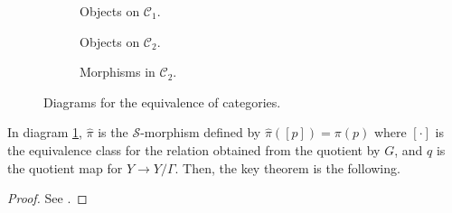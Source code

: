\begin{figure}[htbp]
    \renewcommand\figurename{Diagram}
    \centering
    \begin{subfigure}[b]{0.32\textwidth}
        \centering
        \caption{Objects on \(\mathcal{C}_1\).}
        \label{diag_c1}
    \end{subfigure}%
        \begin{subfigure}[b]{0.32\textwidth}
        \centering
        \caption{Objects on \(\mathcal{C}_2\).}
        \label{diag_c22}
    \end{subfigure}%
    \begin{subfigure}[b]{0.32\textwidth}
        \centering
        \caption{Morphisms in \(\mathcal{C}_2\).}
        \label{diag_c2}
    \end{subfigure}
    \caption{Diagrams for the equivalence of categories.}
\end{figure}
In diagram \ref{diag_c1}, \(\hat{\pi}\) is the \(\mathcal{S}\)-morphism defined by \(\hat{\pi}([p])=\pi(p)\) where \([\cdot]\) is the equivalence class for the relation obtained from the quotient by \(G\), and \(q\) is the quotient map for \(Y \to Y/\Gamma\). Then, the key theorem is the following.

\begin{proof}
    See \parencite[Sec. 4.1]{barajas2023non}.
\end{proof}

